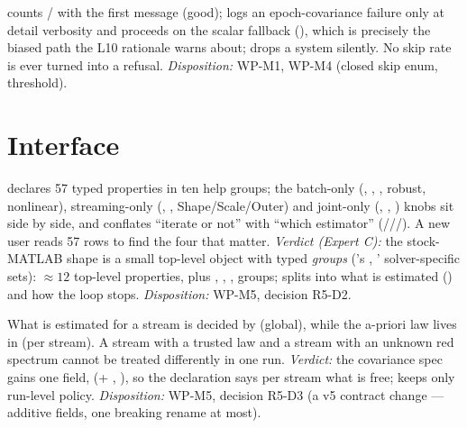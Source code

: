   counts / with the first message (good);  logs an epoch-covariance failure only at detail verbosity and proceeds on the scalar fallback (), which is precisely the biased path the L10 rationale warns about;  drops a system silently. No skip rate is ever turned into a refusal. \textit{Disposition:} WP-M1, WP-M4 (closed skip enum, threshold).

\section*{Interface}

  declares 57 typed properties in ten help groups; the batch-only (, , , robust, nonlinear), streaming-only (, , Shape/Scale/Outer) and joint-only (, , ) knobs sit side by side, and  conflates ``iterate or not'' with ``which estimator'' (///). A new user reads 57 rows to find the four that matter. \textit{Verdict (Expert C):} the stock-MATLAB shape is a small top-level object with typed \emph{groups} ('s , ' solver-specific sets): $\approx 12$ top-level properties, plus , , ,  groups;  splits into what is estimated () and how the loop stops. \textit{Disposition:} WP-M5, decision R5-D2.

 What is estimated for a stream is decided by  (global), while the a-priori law lives in  (per stream). A stream with a trusted  law and a stream with an unknown red spectrum cannot be treated differently in one run. \textit{Verdict:} the covariance spec gains one field,  (+ , ), so the declaration says per stream what is free;  keeps only run-level policy. \textit{Disposition:} WP-M5, decision R5-D3 (a v5 contract change --- additive fields, one breaking rename at most).

